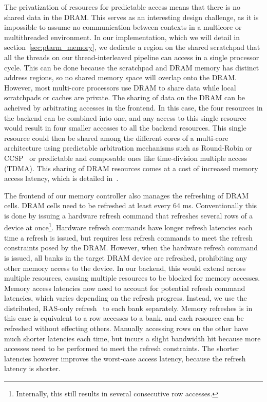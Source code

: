 The privatization of resources for predictable access means that there is no shared data in the DRAM.
This serves as an interesting design challenge, as it is impossible to assume no communication between contexts in a multicore or multithreaded environment.
In our implementation, which we will detail in section~\ref{sec:ptarm_memory}, we dedicate a region on the shared scratchpad that all the threads on our thread-interleaved pipeline can access in a single processor cycle.
This can be done because the scratchpad and DRAM memory has distinct address regions, so no shared memory space will overlap onto the DRAM. 
However, most multi-core processors use DRAM to share data while local scratchpads or caches are private.
The sharing of data on the DRAM can be acheived by arbitrating accesses in the frontend.
In this case, the four resources in the backend can be combined into one, and any access to this single resource would result in four smaller accesses to all the backend resources. 
This single resource could then be shared among the different cores of a multi-core architecture using predictable arbitration mechanisms such as Round-Robin or CCSP~\cite{Akesson08} or predictable and composable ones like time-division multiple access (TDMA). 
This sharing of DRAM resources comes at a cost of increased memory access latency, which is detailed in~\cite{ReinekeLiuPatelKimLee11_PRETDRAMControllerBankPrivatizationForPredictability}. 

The frontend of our memory controller also manages the refreshing of DRAM cells. 
DRAM cells need to be refreshed at least every 64 ms.
Conventionally this is done by issuing a hardware refresh command that refreshes several rows of a device at once\footnote{Internally, this still results in several consecutive row accesses.}.
Hardware refresh commands have longer refresh latencies each time a refresh is issued, but requires less refresh commands to meet the refresh constraints posed by the DRAM.
However, when the hardware refresh command is issued, all banks in the target DRAM device are refreshed, prohibiting any other memory access to the device.
In our backend, this would extend across multiple resources, causing multiple resources to be blocked for memory accesses. 
Memory access latencies now need to account for potential refresh command latencies, which varies depending on the refresh progress.  
Instead, we use the distributed, RAS-only refresh~\cite{spec:micronddr2} to each bank separately.
Memory refreshes is in this case is equivalent to a row accesses to a bank, and each resource can be refreshed without effecting others.
Manually accessing rows on the other have much shorter latencies each time, but incurs a slight bandwidth hit because more accesses need to be performed to meet the refresh constraints.
The shorter latencies however improves the worst-case access latency, because the refresh latency is shorter.

